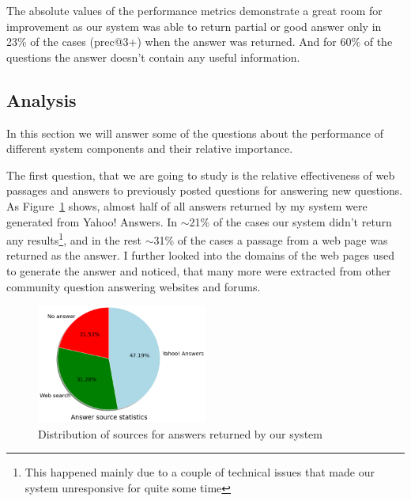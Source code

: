 The absolute values of the performance metrics demonstrate a great room for improvement as our system was able to return partial or good answer only in 23\% of the cases (prec@3+) when the answer was returned.
And for 60\% of the questions the answer doesn't contain any useful information.

\subsection{Analysis}
\label{section:non-factoid:liveqa:analysis}

In this section we will answer some of the questions about the performance of different system components and their relative importance.

The first question, that we are going to study is the relative effectiveness of web passages and answers to previously posted questions for answering new questions.
As Figure~\ref{figure:non-factoid:liveqa:answer_source_pie} shows, almost half of all answers returned by my system were generated from Yahoo! Answers.
In $\sim$21\% of the cases our system didn't return any results\footnote{This happened mainly due to a couple of technical issues that made our system unresponsive for quite some time}, and in the rest $\sim$31\% of the cases a passage from a web page was returned as the answer.
I further looked into the domains of the web pages used to generate the answer and noticed, that many more were extracted from other community question answering websites and forums.

\begin{figure}
	\centering
	\includegraphics[width=0.5\textwidth]{img/liveqa_answer_source}
	\caption{Distribution of sources for answers returned by our system}
	\label{figure:non-factoid:liveqa:answer_source_pie}
\end{figure}

